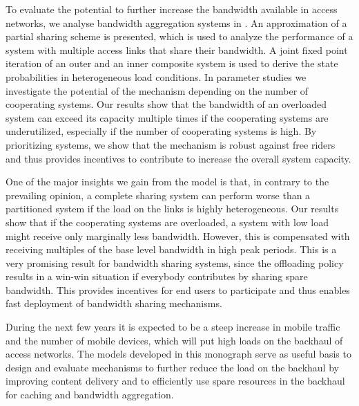 To evaluate the potential to further increase the bandwidth available in access networks, we analyse bandwidth aggregation systems in .
An approximation of a partial sharing scheme is presented, which is used to analyze the performance of a system with multiple access links that share their bandwidth.
A joint fixed point iteration of an outer and an inner composite system is used to derive the state probabilities in heterogeneous load conditions.
In parameter studies we investigate the potential of the mechanism depending on the number of cooperating systems.
Our results show that the bandwidth of an overloaded system can exceed its capacity multiple times if the cooperating systems are underutilized, especially if the number of cooperating systems is high.
By prioritizing systems, we show that the mechanism is robust against free riders and thus provides incentives to contribute to increase the overall system capacity.

One of the major insights we gain from the model is that, in contrary to the prevailing opinion, a complete sharing system can perform worse than a partitioned system if the load on the links is highly heterogeneous.
Our results show that if the cooperating systems are overloaded, a system with low load might receive only marginally less bandwidth.
However, this is compensated with receiving multiples of the base level bandwidth in high peak periods.
This is a very promising result for bandwidth sharing systems, since the offloading policy results in a win-win situation if everybody contributes by sharing spare bandwidth.
This provides incentives for end users to participate and thus enables fast deployment of bandwidth sharing mechanisms.

During the next few years it is expected to be a steep increase in mobile traffic and the number of mobile devices, which will put high loads on the backhaul of access networks.
The models developed in this monograph serve as useful basis to design and evaluate mechanisms to further reduce the load on the backhaul by improving content delivery and to efficiently use spare resources in the backhaul for caching and bandwidth aggregation.
